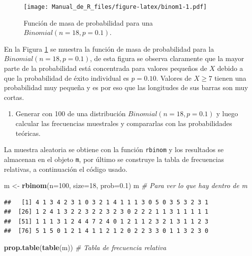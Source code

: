 \documentclass[10pt,]{krantz}
\makeatletter
\newenvironment{Shaded}{\begin{snugshade}}{\end{snugshade}}
\newcommand{\KeywordTok}[1]{\textcolor[rgb]{0.13,0.29,0.53}{\textbf{#1}}}
\newcommand{\DataTypeTok}[1]{\textcolor[rgb]{0.13,0.29,0.53}{#1}}
\newcommand{\DecValTok}[1]{\textcolor[rgb]{0.00,0.00,0.81}{#1}}
\newcommand{\FloatTok}[1]{\textcolor[rgb]{0.00,0.00,0.81}{#1}}
\newcommand{\StringTok}[1]{\textcolor[rgb]{0.31,0.60,0.02}{#1}}
\newcommand{\CommentTok}[1]{\textcolor[rgb]{0.56,0.35,0.01}{\textit{#1}}}
\newcommand{\NormalTok}[1]{#1}
\providecommand{\tightlist}{%
  \setlength{\itemsep}{0pt}\setlength{\parskip}{0pt}}
\newenvironment{kframe}{%
\medskip{}
\setlength{\fboxsep}{.8em}
 \def\at@end@of@kframe{}%
 \ifinner\ifhmode%
  \def\at@end@of@kframe{\end{minipage}}%
  \begin{minipage}{\columnwidth}%
 \fi\fi%
 \def\FrameCommand##1{\hskip\@totalleftmargin \hskip-\fboxsep
 \colorbox{shadecolor}{##1}\hskip-\fboxsep
     \hskip-\linewidth \hskip-\@totalleftmargin \hskip\columnwidth}%
 \MakeFramed {\advance\hsize-\width
   \@totalleftmargin\z@ \linewidth\hsize
   \@setminipage}}%
 {\par\unskip\endMakeFramed%
 \at@end@of@kframe}
\renewenvironment{Shaded}{\begin{kframe}}{\end{kframe}}
\makeatother
\begin{document}
\begin{figure}
\centering
\texttt{[image: Manual\_de\_R\_files/figure-latex/binom1-1.pdf]}
\caption{\label{fig:binom1}Función de masa de probabilidad para una
\(Binomial(n=18, p=0.1)\).}
\end{figure}

En la Figura \ref{fig:binom1} se muestra la función de masa de
probabilidad para la \(Binomial(n=18, p=0.1)\), de esta figura se
observa claramente que la mayor parte de la probabilidad está
concentrada para valores pequeños de \(X\) debido a que la probabilidad
de éxito individual es \(p=0.10\). Valores de \(X \geq 7\) tienen una
probabilidad muy pequeña y es por eso que las longitudes de sus barras
son muy cortas.

\begin{enumerate}
\def\labelenumi{\arabic{enumi})}
\setcounter{enumi}{4}
\tightlist
\item
  Generar con 100 de una distribución \(Binomial(n=18, p=0.1)\) y luego
  calcular las frecuencias muestrales y compararlas con las
  probabilidades teóricas.
\end{enumerate}

La muestra aleatoria se obtiene con la función \texttt{rbinom} y los
resultados se almacenan en el objeto \texttt{m}, por último se construye
la tabla de frecuencias relativas, a continuación el código usado.

\begin{Shaded}
\begin{Highlighting}[]
\NormalTok{m <-}\StringTok{ }\KeywordTok{rbinom}\NormalTok{(}\DataTypeTok{n=}\DecValTok{100}\NormalTok{, }\DataTypeTok{size=}\DecValTok{18}\NormalTok{, }\DataTypeTok{prob=}\FloatTok{0.1}\NormalTok{)}
\NormalTok{m  }\CommentTok{# Para ver lo que hay dentro de m}
\end{Highlighting}
\end{Shaded}

\begin{verbatim}
##   [1] 4 1 3 4 2 3 1 0 3 2 1 4 1 1 1 3 0 5 0 3 5 3 2 3 1
##  [26] 1 2 4 1 3 2 2 3 2 2 3 2 3 0 2 2 2 1 1 3 1 1 1 1 1
##  [51] 1 1 1 3 1 2 4 4 7 2 4 0 1 2 1 1 2 3 2 1 3 1 1 2 3
##  [76] 5 1 5 0 1 2 1 4 1 1 2 1 2 0 2 2 3 3 0 1 1 3 2 3 0
\end{verbatim}

\begin{Shaded}
\begin{Highlighting}[]
\KeywordTok{prop.table}\NormalTok{(}\KeywordTok{table}\NormalTok{(m))  }\CommentTok{# Tabla de frecuencia relativa}
\end{Highlighting}
\end{Shaded}
\end{document}

